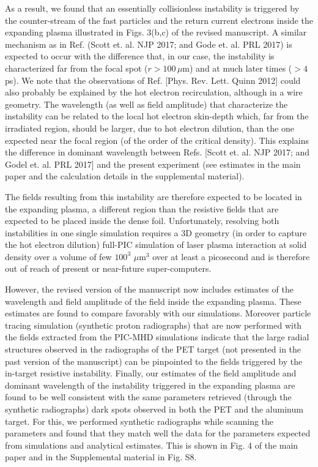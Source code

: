 \documentclass[aps,showpacs,superscriptaddress]{revtex4}%
\begin{document}
\begin{enumerate}
As a result, we found that an essentially collisionless instability  is triggered by the counter-stream of the fast particles and the return current electrons  inside the expanding plasma illustrated in Figs. 3(b,c) of the revised manuscript.
A similar mechanism as in Ref. (Scott et. al. NJP 2017; and Gode et. al. PRL 2017)   is expected to occur with the difference that, in our case,  the instability is characterized far from the focal spot ($r > 100 \, \mu$m) and at much later times ($>4$ ps).
We note that the observations of Ref. [Phys. Rev. Lett. Quinn 2012] could also probably be explained by the hot electron recirculation, although  in a wire geometry.
The wavelength (as well as field amplitude) that characterize the instability can be related to the local hot electron skin-depth which,  far from the irradiated region, should be larger, due to hot electron dilution, than the one expected near the focal region (of the order of the critical density). This explains the difference in dominant wavelength between Refs. [Scott et. al. NJP 2017; and Godel et. al. PRL 2017]  and the present experiment (see estimates in the main paper and the calculation details in the supplemental material).

The fields resulting from this instability  are therefore expected to be located in the expanding plasma, a different region than the resistive fields that are expected to be placed inside the dense foil.
Unfortunately, resolving both instabilities in one single simulation requires a  3D geometry (in order to capture the hot electron dilution) full-PIC simulation of laser plasma interaction at solid density over a volume of  few   $100^3$ $\mu$m$^3$   over at least a picosecond and is therefore out of reach of present or near-future super-computers.

However, the revised version of the manuscript now includes estimates of the wavelength and field amplitude of the field inside the expanding plasma. These estimates are found to compare favorably with our simulations.  Moreover particle tracing simulation (synthetic proton radiographs) that are now performed with the fields extracted from the PIC-MHD simulations indicate that the large radial structures observed in the radiographs of the PET target (not presented in the past version of the manuscript) can be pinpointed to the fields triggered by the in-target resistive instability.
Finally, our estimates of the field amplitude and dominant wavelength of the instability triggered in the expanding plasma are found to be well consistent with the same parameters retrieved (through the synthetic radiographs) dark spots observed in both the PET and the aluminum target. For this, we performed synthetic radiographs while scanning the parameters and found that they match well the data for the parameters expected from simulations and analytical estimates. This is shown in Fig. 4  of the main paper  and in the Supplemental material in Fig. S8.



\end{enumerate}
\end{document}
